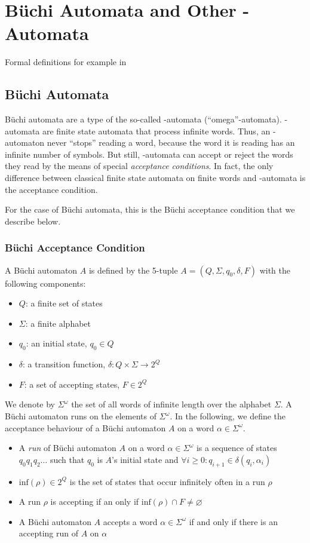 \section{Büchi Automata and Other \om-Automata}

Formal definitions for example in~\cite{Thomas:1991}\cite{1996_thomas}\cite{2014_wilke}

\subsection{Büchi Automata}
Büchi automata are a type of the so-called \om-automata (``omega''-automata). \om-automata are finite state automata that process infinite words. Thus, an \om-automaton never ``stops'' reading a word, because the word it is reading has an infinite number of symbols. But still, \om-automata can accept or reject the words they read by the means of special \textit{acceptance conditions}. In fact, the only difference between classical finite state automata on finite words and \om-automata is the acceptance condition. 

For the case of Büchi automata, this is the Büchi acceptance condition that we describe below.

\subsubsection{Büchi Acceptance Condition}

A Büchi automaton $A$ is defined by the 5-tuple $A = (Q, \Sigma, q_0, \delta, F)$ with the following components:
\begin{itemize}
\item $Q$: a finite set of states
\item $\Sigma$: a finite alphabet
\item $q_0$: an initial state, $q_0 \in Q$
\item $\delta$: a transition function, $\delta: Q \times \Sigma \rightarrow 2^Q$
\item $F$: a set of accepting states, $F \in 2^Q$
\end{itemize}

We denote by $\Sigma^\omega$ the set of all words of infinite length over the alphabet $\Sigma$. A Büchi automaton runs on the elements of $\Sigma^\omega$. In the following, we define the acceptance behaviour of a Büchi automaton $A$ on a word $\alpha \in \Sigma^\omega$.

\begin{itemize}
\item A \emph{run} of Büchi automaton $A$ on a word $\alpha \in \Sigma^\omega$ is a sequence of states $q_0q_1q_2\dots$ such that $q_0$ is $A$'s initial state and $\forall i \geq 0: q_{i+1} \in \delta(q_i, \alpha_i)$
\item $\textrm{inf}(\rho) \in 2^Q$ is the set of states that occur infinitely often in a run $\rho$
\item A run $\rho$ is accepting if an only if $\textrm{inf}(\rho) \cap F \neq \varnothing$
\item A Büchi automaton $A$ accepts a word $\alpha \in \Sigma^\omega$ if and only if there is an accepting run of $A$ on $\alpha$
\end{itemize}


